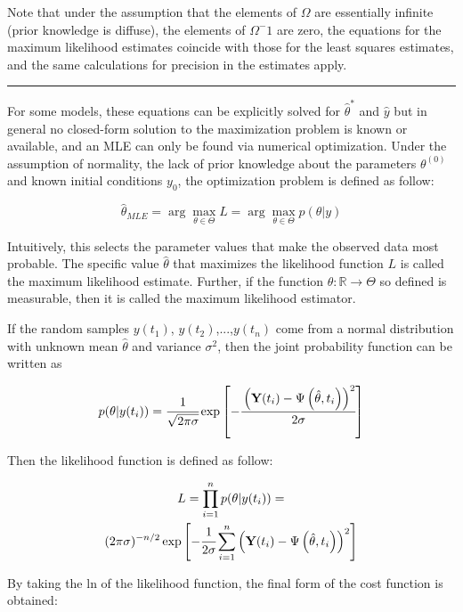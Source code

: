 \documentclass[a4paper,fleqn]{cas-dc}
\begin{document}
Note that under the assumption that the elements of $\Omega$ are essentially infinite (prior knowledge is diffuse), the elements of $\Omega^-1$ are zero, the equations for the maximum likelihood estimates coincide with those for the least squares estimates, and the same calculations for precision in the estimates apply.

\hrule

For some models, these equations can be explicitly solved for $\hat{\theta}^*$ and $\hat{y}$ but in general no closed-form solution to the maximization problem is known or available, and an MLE can only be found via numerical optimization. Under the assumption of normality, the lack of prior knowledge about the parameters $\theta^{(0)}$ and known initial conditions $y_0$, the optimization problem is defined as follow:

\begin{equation}
	\hat{\theta}_{MLE} = \arg \max_{\theta \in \Theta} L = \arg \max_{\theta \in \Theta} p(\theta|y)
\end{equation}

Intuitively, this selects the parameter values that make the observed data most probable. The specific value $\hat{\theta}$ that maximizes the likelihood function $L$ is called the maximum likelihood estimate. Further, if the function $\hat{\theta}:\mathbb{R}\rightarrow\Theta$ so defined is measurable, then it is called the maximum likelihood estimator.

If the random samples $y(t_1)$, $y(t_2)$,...,$y(t_n)$ come from a normal distribution with unknown mean $\hat{\theta}$ and variance $\sigma^2$, then the joint probability function can be written as 

\begin{equation}
	p(\theta|y(t_i)) = \cfrac{1}{\sqrt{2\pi\sigma}}\exp\left[-\cfrac{ \left( \textbf{Y}(t_i) - \Psi\left( \hat{\theta}, t_i \right) \right)^2}{2\sigma}\right]
\end{equation}

Then the likelihood function is defined as follow:

\begin{multline} 
	L =\prod\limits_{i=1}^n p(\theta|y(t_i)) = \\ (2\pi\sigma)^{-n/2}\exp\left[-\cfrac{1}{2\sigma}\sum\limits_{i=1}^n \left( \textbf{Y}(t_i) - \Psi\left( \hat{\theta}, t_i \right) \right)^2\right]
\end{multline}

By taking the ln of the likelihood function, the final form of the cost function is obtained:
\end{document}
